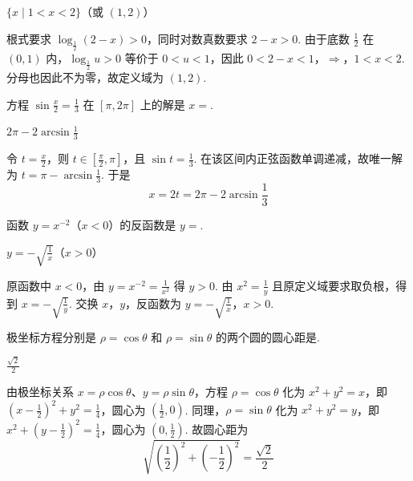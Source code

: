 \begin{answer}
\(\{x\mid 1<x<2\}\)（或 \((1,2)\)）
\end{answer}

\begin{solution}
根式要求 \(\log_{\frac{1}{2}}(2-x)>0\)，同时对数真数要求 \(2-x>0\). 由于底数 \(\frac{1}{2}\) 在 \((0,1)\) 内，\(\log_{\frac{1}{2}}u>0\) 等价于 \(0<u<1\)，因此
\(0<2-x<1\)，\(\Longrightarrow\)，\(1<x<2\).
分母也因此不为零，故定义域为 \((1,2)\).
\end{solution}

\begin{problem}
方程 \(\sin\frac{x}{2}=\frac{1}{3}\) 在 \(\left[\pi,2\pi\right]\) 上的解是 \(x=\)\fillinblank{}.
\end{problem}

\begin{answer}
\(2\pi - 2\arcsin \frac{1}{3}\)
\end{answer}

\begin{solution}
令 \(t=\frac{x}{2}\)，则 \(t\in\left[\frac{\pi}{2},\pi\right]\)，且 \(\sin t=\frac{1}{3}\). 在该区间内正弦函数单调递减，故唯一解为 \(t=\pi-\arcsin\frac{1}{3}\). 于是
\[
x=2t=2\pi-2\arcsin\frac{1}{3}
\]
\end{solution}

\begin{problem}
函数 \(y=x^{-2}\)（\(x<0\)）的反函数是 \(y=\)\fillinblank{}.
\end{problem}

\begin{answer}
\(y=-\sqrt{\frac{1}{x}}\)（\(x>0\)）
\end{answer}

\begin{solution}
原函数中 \(x<0\)，由 \(y=x^{-2}=\frac{1}{x^2}\) 得 \(y>0\). 由 \(x^2=\frac{1}{y}\) 且原定义域要求取负根，得到 \(x=-\sqrt{\frac{1}{y}}\). 交换 \(x\)，\(y\)，反函数为
\(y=-\sqrt{\frac{1}{x}}\)，\(x>0\).
\end{solution}

\begin{problem}
极坐标方程分别是 \(\rho=\cos\theta\) 和 \(\rho=\sin\theta\) 的两个圆的圆心距是\fillinblank{}.
\end{problem}

\begin{answer}
\(\frac{\sqrt{2}}{2}\)
\end{answer}

\begin{solution}
由极坐标关系 \(x=\rho\cos\theta\)、\(y=\rho\sin\theta\)，方程 \(\rho=\cos\theta\) 化为 \(x^2+y^2=x\)，即 \(\left(x-\frac{1}{2}\right)^2+y^2=\frac{1}{4}\)，圆心为 \(\left(\frac{1}{2},0\right)\). 同理，\(\rho=\sin\theta\) 化为 \(x^2+y^2=y\)，即 \(x^2+\left(y-\frac{1}{2}\right)^2=\frac{1}{4}\)，圆心为 \(\left(0,\frac{1}{2}\right)\). 故圆心距为
\[
\sqrt{\left(\frac{1}{2}\right)^2+\left(-\frac{1}{2}\right)^2}=\frac{\sqrt{2}}{2}
\]
\end{solution}

